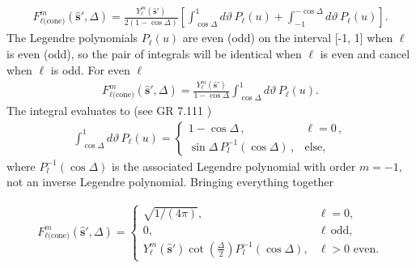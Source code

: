 \documentclass[]{osa-article}
\providecommand{\mh}[1]{\mathbf{\hat{#1}}}
\begin{document}
\begin{align}
    F_{\ell\text{(cone)}}^m(\mh{s}', \Delta) = \frac{Y_\ell^m(\mh{s}')}{2(1 - \cos\Delta)}\left[\int_{\cos\Delta}^1 d\vartheta\, P_\ell(u) + \int_{-1}^{-\cos\Delta} d\vartheta\, P_\ell(u)\right]. 
\end{align}
The Legendre polynomials $P_\ell(u)$ are even (odd) on the interval [-1, 1] when
$\ell$ is even (odd), so the pair of integrals will be identical when $\ell$ is
even and cancel when $\ell$ is odd. For even $\ell$
\begin{align}
  F_{\ell\text{(cone)}}^m(\mh{s}', \Delta) = \frac{Y_\ell^m(\mh{s}')}{1 - \cos\Delta}\int_{\cos\Delta}^1 d\vartheta\, P_\ell(u).
\end{align}
The integral evaluates to (see GR 7.111 \cite{gradshteyn2007})
\begin{align}
  \int_{\cos\Delta}^1 d\vartheta\, P_\ell(u) =
\begin{cases}
  1 - \cos\Delta\,, &\ell = 0\,,\\
  \sin\Delta\, P_l^{-1}(\cos\Delta)\,, &\text{else},
\end{cases}
\end{align}
where $P_l^{-1}(\cos\Delta)$ is the associated Legendre polynomial with order
$m=-1$, not an inverse Legendre polynomial. Bringing everything together

\begin{align}
  F_{\ell\text{(cone)}}^m(\mh{s}', \Delta) =
  \begin{cases}
    \sqrt{1/(4\pi)}, & \ell = 0,\\
    0, & \ell\, \text{odd},\\
    Y_\ell^m(\mh{s}')\cot\left(\frac{\Delta}{2}\right)P_l^{-1}(\cos\Delta), & \ell > 0\,\, \text{even}.
  \end{cases}
\end{align}
\end{document}
